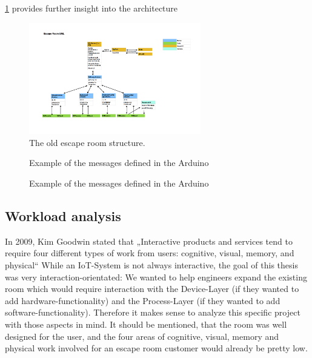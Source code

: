 \ref{fig:oldEscapeUml} provides further insight into the architecture
\begin{figure}[th]
	\centering
	\includegraphics[width=75mm,scale=0.75]{Figures/oldEscapeUml}
	\decoRule
	\caption[UML]{The old escape room structure.}
	\label{fig:oldEscapeUml}
\end{figure}
\begin{figure}[th]
    \decoRule
    \caption[messages]{Example of the messages defined in the Arduino}
    \label{fig:switchCase}
\end{figure}
\begin{figure}[th]
    \decoRule
    \caption[messages]{Example of the messages defined in the Arduino}
    \label{fig:c++window}
\end{figure}

\subsection{Workload analysis}
In 2009, Kim Goodwin stated that 
„Interactive products and services tend to require four different types of work from users: 
cognitive, visual, memory, and physical“ \parencite{designDigitalAge} 
While an IoT-System is not always interactive, the goal of this thesis was very interaction-orientated: 
We wanted to help engineers expand the existing room which would require 
interaction with the Device-Layer (if they wanted to add hardware-functionality) 
and the Process-Layer (if they wanted to add software-functionality).
Therefore it makes sense to analyze this specific project with those aspects in mind. 
It should be mentioned, that the room was well designed for the user, and the four areas of cognitive, visual, memory and physical work involved for an escape room customer would already be pretty low.

